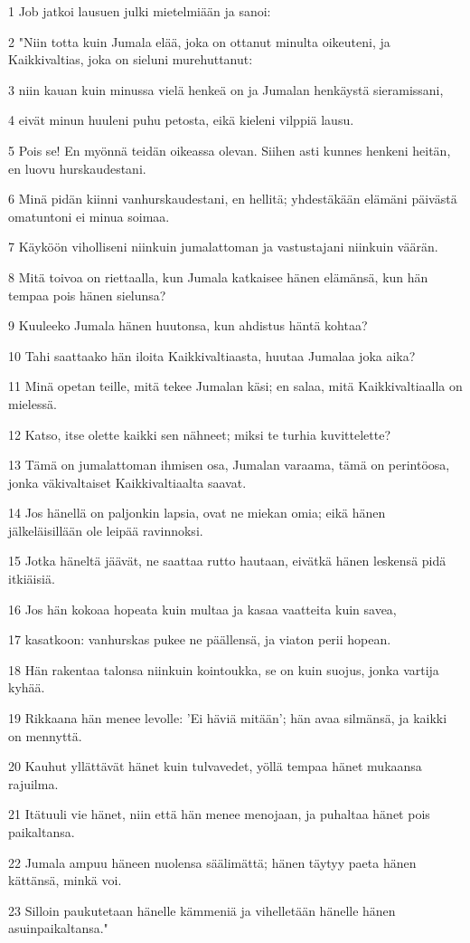 \par 1 Job jatkoi lausuen julki mietelmiään ja sanoi:
\par 2 "Niin totta kuin Jumala elää, joka on ottanut minulta oikeuteni, ja Kaikkivaltias, joka on sieluni murehuttanut:
\par 3 niin kauan kuin minussa vielä henkeä on ja Jumalan henkäystä sieramissani,
\par 4 eivät minun huuleni puhu petosta, eikä kieleni vilppiä lausu.
\par 5 Pois se! En myönnä teidän oikeassa olevan. Siihen asti kunnes henkeni heitän, en luovu hurskaudestani.
\par 6 Minä pidän kiinni vanhurskaudestani, en hellitä; yhdestäkään elämäni päivästä omatuntoni ei minua soimaa.
\par 7 Käyköön viholliseni niinkuin jumalattoman ja vastustajani niinkuin väärän.
\par 8 Mitä toivoa on riettaalla, kun Jumala katkaisee hänen elämänsä, kun hän tempaa pois hänen sielunsa?
\par 9 Kuuleeko Jumala hänen huutonsa, kun ahdistus häntä kohtaa?
\par 10 Tahi saattaako hän iloita Kaikkivaltiaasta, huutaa Jumalaa joka aika?
\par 11 Minä opetan teille, mitä tekee Jumalan käsi; en salaa, mitä Kaikkivaltiaalla on mielessä.
\par 12 Katso, itse olette kaikki sen nähneet; miksi te turhia kuvittelette?
\par 13 Tämä on jumalattoman ihmisen osa, Jumalan varaama, tämä on perintöosa, jonka väkivaltaiset Kaikkivaltiaalta saavat.
\par 14 Jos hänellä on paljonkin lapsia, ovat ne miekan omia; eikä hänen jälkeläisillään ole leipää ravinnoksi.
\par 15 Jotka häneltä jäävät, ne saattaa rutto hautaan, eivätkä hänen leskensä pidä itkiäisiä.
\par 16 Jos hän kokoaa hopeata kuin multaa ja kasaa vaatteita kuin savea,
\par 17 kasatkoon: vanhurskas pukee ne päällensä, ja viaton perii hopean.
\par 18 Hän rakentaa talonsa niinkuin kointoukka, se on kuin suojus, jonka vartija kyhää.
\par 19 Rikkaana hän menee levolle: 'Ei häviä mitään'; hän avaa silmänsä, ja kaikki on mennyttä.
\par 20 Kauhut yllättävät hänet kuin tulvavedet, yöllä tempaa hänet mukaansa rajuilma.
\par 21 Itätuuli vie hänet, niin että hän menee menojaan, ja puhaltaa hänet pois paikaltansa.
\par 22 Jumala ampuu häneen nuolensa säälimättä; hänen täytyy paeta hänen kättänsä, minkä voi.
\par 23 Silloin paukutetaan hänelle kämmeniä ja vihelletään hänelle hänen asuinpaikaltansa."

